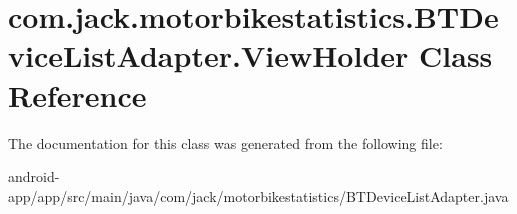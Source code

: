 \hypertarget{classcom_1_1jack_1_1motorbikestatistics_1_1_b_t_device_list_adapter_1_1_view_holder}{}\section{com.\+jack.\+motorbikestatistics.\+B\+T\+Device\+List\+Adapter.\+View\+Holder Class Reference}
\label{classcom_1_1jack_1_1motorbikestatistics_1_1_b_t_device_list_adapter_1_1_view_holder}


The documentation for this class was generated from the following file\+:\begin{DoxyCompactItemize}
\item 
android-\/app/app/src/main/java/com/jack/motorbikestatistics/B\+T\+Device\+List\+Adapter.\+java\end{DoxyCompactItemize}
